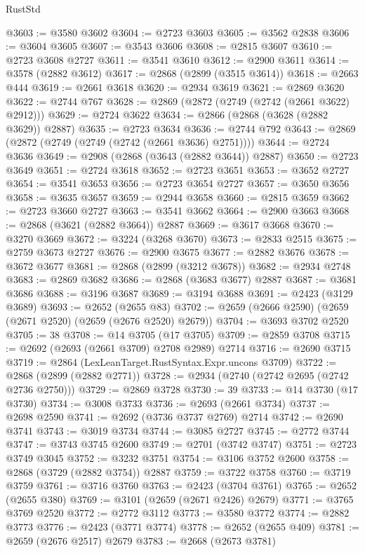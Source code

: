 \begin{lexlean}{RustStd}
\begin{coremodule}
@3603 := @3580 @3602
@3604 := @2723 @3603
@3605 := @3562 @2838
@3606 := @3604 @3605
@3607 := @3543 @3606
@3608 := @2815 @3607
@3610 := @2723 @3608 @2727
@3611 := @3541 @3610
@3612 := @2900 @3611
@3614 := @3578 (@2882 @3612)
@3617 := @2868 (@2899 (@3515 @3614))
@3618 := @2663 @444
@3619 := @2661 @3618
@3620 := @2934 @3619
@3621 := @2869 @3620
@3622 := @2744 @767
@3628 := @2869 (@2872 (@2749 (@2742 (@2661 @3622) @2912)))
@3629 := @2724 @3622
@3634 := @2866 (@2868 (@3628 (@2882 @3629)) @2887)
@3635 := @2723 @3634
@3636 := @2744 @792
@3643 := @2869 (@2872 (@2749 (@2749 (@2742 (@2661 @3636) @2751))))
@3644 := @2724 @3636
@3649 := @2908 (@2868 (@3643 (@2882 @3644)) @2887)
@3650 := @2723 @3649
@3651 := @2724 @3618
@3652 := @2723 @3651
@3653 := @3652 @2727
@3654 := @3541 @3653
@3656 := @2723 @3654 @2727
@3657 := @3650 @3656
@3658 := @3635 @3657
@3659 := @2944 @3658
@3660 := @2815 @3659
@3662 := @2723 @3660 @2727
@3663 := @3541 @3662
@3664 := @2900 @3663
@3668 := @2868 (@3621 (@2882 @3664)) @2887
@3669 := @3617 @3668
@3670 := @3270 @3669
@3672 := @3224 (@3268 @3670)
@3673 := @2833 @2515
@3675 := @2759 @3673 @2727
@3676 := @2900 @3675
@3677 := @2882 @3676
@3678 := @3672 @3677
@3681 := @2868 (@2899 (@3212 @3678))
@3682 := @2934 @2748
@3683 := @2869 @3682
@3686 := @2868 (@3683 @3677) @2887
@3687 := @3681 @3686
@3688 := @3196 @3687
@3689 := @3194 @3688
@3691 := @2423 (@3129 @3689)
@3693 := @2652 (@2655 @83)
@3702 := @2659 (@2666 @2590) (@2659 (@2671 @2520) (@2659 (@2676 @2520) @2679))
@3704 := @3693 @3702 @2520
@3705 := 38
@3708 := @14 @3705 (@17 @3705)
@3709 := @2859 @3708
@3715 := @2692 (@2693 (@2661 @3709) @2708 @2989) @2714
@3716 := @2690 @3715
@3719 := @2864 (LexLeanTarget.RustSyntax.Expr.uncons @3709)
@3722 := @2868 (@2899 (@2882 @2771))
@3728 := @2934 (@2740 (@2742 @2695 (@2742 @2736 @2750)))
@3729 := @2869 @3728
@3730 := 39
@3733 := @14 @3730 (@17 @3730)
@3734 := @3008 @3733
@3736 := @2693 (@2661 @3734)
@3737 := @2698 @2590
@3741 := @2692 (@3736 @3737 @2769) @2714
@3742 := @2690 @3741
@3743 := @3019 @3734
@3744 := @3085 @2727
@3745 := @2772 @3744
@3747 := @3743 @3745 @2600
@3749 := @2701 (@3742 @3747)
@3751 := @2723 @3749 @3045
@3752 := @3232 @3751
@3754 := @3106 @3752 @2600
@3758 := @2868 (@3729 (@2882 @3754)) @2887
@3759 := @3722 @3758
@3760 := @3719 @3759
@3761 := @3716 @3760
@3763 := @2423 (@3704 @3761)
@3765 := @2652 (@2655 @380)
@3769 := @3101 (@2659 (@2671 @2426) @2679)
@3771 := @3765 @3769 @2520
@3772 := @2772 @3112
@3773 := @3580 @3772
@3774 := @2882 @3773
@3776 := @2423 (@3771 @3774)
@3778 := @2652 (@2655 @409)
@3781 := @2659 (@2676 @2517) @2679
@3783 := @2668 (@2673 @3781)

\end{coremodule}
\end{lexlean}
